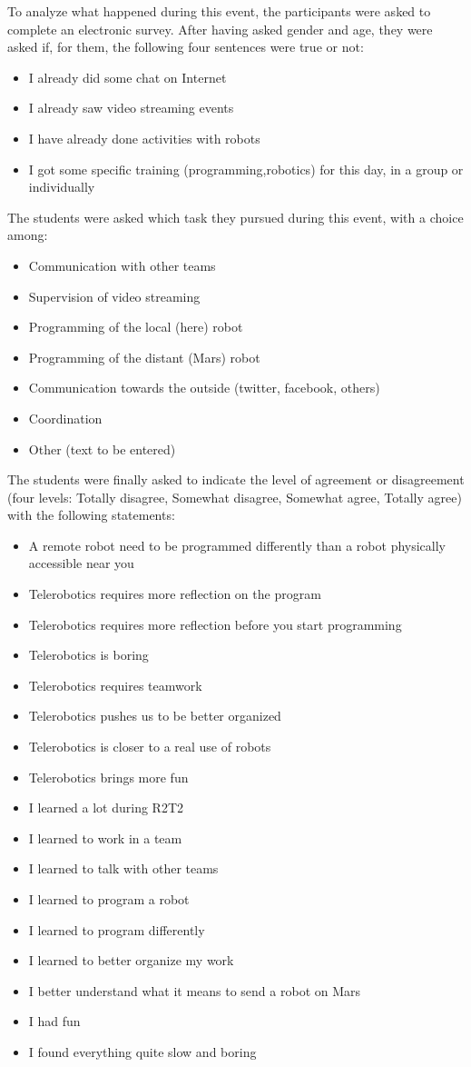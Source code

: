 \documentclass{intech-journal}
\begin{document}
To analyze what happened during this event, the participants were asked to complete an electronic survey.
After having asked gender and age, they were asked if, for them, the following four sentences were true or not:
\begin{itemize}
\item I already did some chat on Internet 	
\item I already saw video streaming events 	
\item I have already done activities with robots 
\item I got some specific training (programming,robotics) for this day, in a group or individually
\end{itemize}
The students were asked which task they pursued during this event, with a choice among:
\begin{itemize}
\item Communication with other teams
\item Supervision of video streaming
\item Programming of the local (here) robot
\item Programming of the distant (Mars) robot
\item Communication towards the outside (twitter, facebook, others)
\item Coordination
\item Other (text to be entered)
\end{itemize}
The students were finally asked to indicate the level of agreement or disagreement (four levels: Totally disagree, Somewhat disagree, Somewhat agree, Totally agree) with the following statements:
\begin{itemize}
\item A remote robot need to be programmed differently than a robot physically accessible near you 	
\item Telerobotics requires more reflection on the program 	
\item Telerobotics requires more reflection before you start programming 	
\item Telerobotics is boring 	
\item Telerobotics requires teamwork 	
\item Telerobotics pushes us to be better organized 	
\item Telerobotics is closer to a real use of robots 	
\item Telerobotics brings more fun
\item I learned a lot during R2T2 	
\item I learned to work in a team 	
\item I learned to talk with other teams 	
\item I learned to program a robot 	
\item I learned to program differently 	
\item I learned to better organize my work 	
\item I better understand what it means to send a robot on Mars 	
\item I had fun 	
\item I found everything quite slow and boring
\end{itemize}
\end{document}
